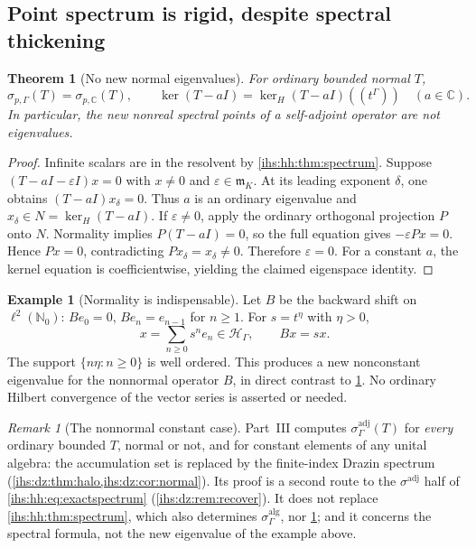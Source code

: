 \documentclass[11pt,a4paper]{article}
\numberwithin{equation}{section}
\newtheorem{theorem}{Theorem}[section]
\theoremstyle{definition}
\newtheorem{example}[example]{Example}
\theoremstyle{remark}
\newtheorem{remark}[remark]{Remark}
\newcommand{\C}{\mathbb C}
\newcommand{\N}{\mathbb N}
\newcommand{\mK}{\mathfrak m_K}
\newcommand{\Hil}{\mathcal H_\Gamma}
\newcommand{\eps}{\varepsilon}
\begin{document}
\subsection{Point spectrum is rigid, despite spectral thickening}\label{ihs:hh:sec:point}
\begin{theorem}[No new normal eigenvalues]\label{ihs:hh:thm:point}
For ordinary bounded normal $T$,
\[
 \sigma_{p,\Gamma}(T)=\sigma_{p,\C}(T),\qquad
 \ker(T-aI)=\ker_H(T-aI)((t^\Gamma))\quad(a\in\C).
\]
In particular, the new nonreal spectral points of a self-adjoint operator
are not eigenvalues.
\end{theorem}
\begin{proof}
Infinite scalars are in the resolvent by \cref{ihs:hh:thm:spectrum}. Suppose
$(T-aI-\eps I)x=0$ with $x\ne0$ and $\eps\in\mK$. At its leading exponent
$\delta$, one obtains $(T-aI)x_\delta=0$. Thus $a$ is an ordinary eigenvalue
and $x_\delta\in N=\ker_H(T-aI)$. If $\eps\ne0$, apply the ordinary
orthogonal projection $P$ onto $N$. Normality implies $P(T-aI)=0$, so the
full equation gives $-\eps Px=0$. Hence $Px=0$, contradicting
$Px_\delta=x_\delta\ne0$. Therefore $\eps=0$. For a constant $a$, the kernel
equation is coefficientwise, yielding the claimed eigenspace identity.
\end{proof}

\begin{example}[Normality is indispensable]\label{ihs:hh:ex:backshift}
Let $B$ be the backward shift on $\ell^2(\N_0)$: $Be_0=0$, $Be_n=e_{n-1}$
for $n\ge1$. For $s=t^\eta$ with $\eta>0$,
\[
 x=\sum_{n\ge0}s^n e_n\in\Hil,\qquad Bx=sx.
\]
The support $\{n\eta:n\ge0\}$ is well ordered. This produces a new
nonconstant eigenvalue for the nonnormal operator $B$, in direct contrast to
\cref{ihs:hh:thm:point}. No ordinary Hilbert convergence of the vector
series is asserted or needed.
\end{example}

\begin{remark}[The nonnormal constant case]\label{ihs:hh:rem:drazin}
Part~III computes $\sigma^{\mathrm{adj}}_\Gamma(T)$ for \emph{every}
ordinary bounded $T$, normal or not, and for constant elements of any unital
algebra: the accumulation set is replaced by the finite-index Drazin
spectrum (\cref{ihs:dz:thm:halo,ihs:dz:cor:normal}). Its proof is a second
route to the $\sigma^{\mathrm{adj}}$ half of \eqref{ihs:hh:eq:exactspectrum}
(\cref{ihs:dz:rem:recover}). It does not replace
\cref{ihs:hh:thm:spectrum}, which also determines
$\sigma^{\mathrm{alg}}_\Gamma$, nor \cref{ihs:hh:thm:point}; and it concerns
the spectral formula, not the new eigenvalue of the example above.
\end{remark}
\end{document}
